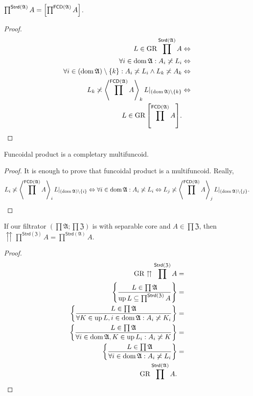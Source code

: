 \begin{prop}
$\prod^{\mathsf{Strd}(\mathfrak{A})}A=\mathord{\mathrel{\left[\prod^{\mathsf{FCD}(\mathfrak{A})}A\right]}}$.\end{prop}
\begin{proof}
~
\begin{align*}
L\in\operatorname{GR}\prod^{\mathsf{Strd}(\mathfrak{A})}A & \Leftrightarrow\\
\forall i\in\operatorname{dom}\mathfrak{A}:A_{i}\not\asymp L_{i} & \Leftrightarrow\\
\forall i\in(\operatorname{dom}\mathfrak{A})\setminus\{k\}:A_{i}\not\asymp L_{i}\land L_{k}\not\asymp A_{k} & \Leftrightarrow\\
L_{k}\not\asymp\left\langle \prod^{\mathsf{FCD}(\mathfrak{A})}A\right\rangle_{k}L|_{(\operatorname{dom}\mathfrak{A})\setminus\{k\}} & \Leftrightarrow\\
L\in\operatorname{GR}\mathord{\mathrel{\left[\prod^{\mathsf{FCD}(\mathfrak{A})}A\right]}}.
\end{align*}
\end{proof}
\begin{cor}
Funcoidal product is a completary multifuncoid.\end{cor}
\begin{proof}
It is enough to prove that funcoidal product is a multifuncoid. Really,
\[
L_{i}\not\asymp\left\langle \prod^{\mathsf{FCD}(\mathfrak{A})}A\right\rangle _{i}L|_{(\operatorname{dom}\mathfrak{A})\setminus\{i\}}\Leftrightarrow\forall i\in\operatorname{dom}\mathfrak{A}:A_{i}\not\asymp L_{i}\Leftrightarrow L_{j}\not\asymp\left\langle \prod^{\mathsf{FCD}(\mathfrak{A})}A\right\rangle _{j}L|_{(\operatorname{dom}\mathfrak{A})\setminus\{j\}}.
\]
\end{proof}
\begin{thm}
If our filtrator $\left(\prod\mathfrak{A};\prod\mathfrak{Z}\right)$
is with separable core and $A\in\prod\mathfrak{Z}$, then $\upuparrows\prod^{\mathsf{Strd}(\mathfrak{Z})}A=\prod^{\mathsf{Strd}(\mathfrak{A})}A$.\end{thm}
\begin{proof}
~
\begin{align*}
\operatorname{GR}\upuparrows\prod^{\mathsf{Strd}(\mathfrak{Z})}A & =\\
\left\{ \frac{L\in\prod\mathfrak{A}}{\operatorname{up} L\subseteq\prod^{\mathsf{Strd}(\mathfrak{Z})}A}\right\} & =\\
\left\{ \frac{L\in\prod\mathfrak{A}}{\forall K\in\operatorname{up} L,i\in\operatorname{dom}\mathfrak{A}:A_{i}\not\asymp K_{i}}\right\} & =\\
\left\{ \frac{L\in\prod\mathfrak{A}}{\forall i\in\operatorname{dom}\mathfrak{A},K\in\operatorname{up} L_{i}:A_{i}\not\asymp K}\right\} & =\\
\left\{ \frac{L\in\prod\mathfrak{A}}{\forall i\in\operatorname{dom}\mathfrak{A}:A_{i}\not\asymp L_{i}}\right\} & =\\
\operatorname{GR}\prod^{\mathsf{Strd}(\mathfrak{A})}A.
\end{align*}
\end{proof}
